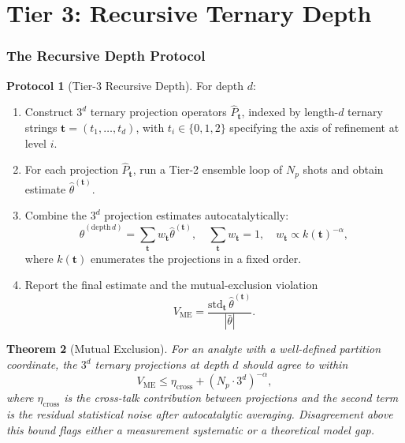 \documentclass[twocolumn,11pt,a4paper]{article}
\theoremstyle{thmstyle}
\newtheorem{theorem}{Theorem}[section]
\theoremstyle{axiomstyle}
\theoremstyle{definition}
\newtheorem{protocol}[theorem]{Protocol}
\theoremstyle{remark}
\newcommand{\Vme}{V_{\mathrm{ME}}}
\begin{document}
\part{Tier 3: Recursive Ternary Depth}
\label{part:tier3}

\section{The Recursive Depth Protocol}
\label{sec:tier3}

\begin{protocol}[Tier-3 Recursive Depth]\label{prot:tier3}
For depth $d$:
\begin{enumerate}[label=\arabic*.,nosep]
\item Construct $3^{d}$ ternary projection operators $\hat{P}_{\bm{t}}$, indexed by length-$d$ ternary strings $\bm{t}=(t_{1},\ldots,t_{d})$, with $t_{i}\in\{0,1,2\}$ specifying the axis of refinement at level $i$.
\item For each projection $\hat{P}_{\bm{t}}$, run a Tier-2 ensemble loop of $N_{p}$ shots and obtain estimate $\hat{\theta}^{(\bm{t})}$.
\item Combine the $3^{d}$ projection estimates autocatalytically:
\begin{equation}
\hat{\theta}^{(\mathrm{depth\,}d)}=\sum_{\bm{t}}w_{\bm{t}}\hat{\theta}^{(\bm{t})},\quad\sum_{\bm{t}}w_{\bm{t}}=1,\quad w_{\bm{t}}\propto k(\bm{t})^{-\alpha},
\end{equation}
where $k(\bm{t})$ enumerates the projections in a fixed order.
\item Report the final estimate and the mutual-exclusion violation
\begin{equation}
\Vme=\frac{\mathrm{std}_{\bm{t}}\,\hat{\theta}^{(\bm{t})}}{|\bar{\theta}|}.
\end{equation}
\end{enumerate}
\end{protocol}

\begin{theorem}[Mutual Exclusion]\label{thm:mutex}
For an analyte with a well-defined partition coordinate, the $3^{d}$ ternary projections at depth $d$ should agree to within
\begin{equation}
\Vme\leq\eta_{\mathrm{cross}}+(N_{p}\cdot 3^{d})^{-\alpha},
\end{equation}
where $\eta_{\mathrm{cross}}$ is the cross-talk contribution between projections and the second term is the residual statistical noise after autocatalytic averaging. Disagreement above this bound flags either a measurement systematic or a theoretical model gap.
\end{theorem}
\end{document}
